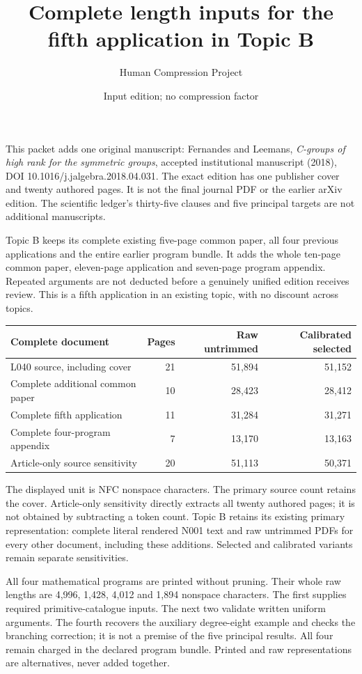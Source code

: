 \documentclass[11pt,a4paper]{article}
\title{Complete length inputs for the fifth application in Topic B}\author{Human Compression Project}\date{Input edition; no compression factor}
\begin{document}
\maketitle
This packet adds one original manuscript: Fernandes and Leemans, \emph{C-groups of high rank for the symmetric groups}, accepted institutional manuscript (2018), DOI 10.1016/j.jalgebra.2018.04.031. The exact edition has one publisher cover and twenty authored pages. It is not the final journal PDF or the earlier arXiv edition. The scientific ledger's thirty-five clauses and five principal targets are not additional manuscripts.

Topic B keeps its complete existing five-page common paper, all four previous applications and the entire earlier program bundle. It adds the whole ten-page common paper, eleven-page application and seven-page program appendix. Repeated arguments are not deducted before a genuinely unified edition receives review. This is a fifth application in an existing topic, with no discount across topics.

\begin{center}\small\begin{tabular}{lrrr}\toprule
Complete document & Pages & Raw untrimmed & Calibrated selected\\\midrule
L040 source, including cover & 21 & 51,894 & 51,152\\
Complete additional common paper & 10 & 28,423 & 28,412\\
Complete fifth application & 11 & 31,284 & 31,271\\
Complete four-program appendix & 7 & 13,170 & 13,163\\
Article-only source sensitivity & 20 & 51,113 & 50,371\\
\bottomrule\end{tabular}\end{center}
The displayed unit is NFC nonspace characters. The primary source count retains the cover. Article-only sensitivity directly extracts all twenty authored pages; it is not obtained by subtracting a token count. Topic B retains its existing primary representation: complete literal rendered N001 text and raw untrimmed PDFs for every other document, including these additions. Selected and calibrated variants remain separate sensitivities.

All four mathematical programs are printed without pruning. Their whole raw lengths are 4,996, 1,428, 4,012 and 1,894 nonspace characters. The first supplies required primitive-catalogue inputs. The next two validate written uniform arguments. The fourth recovers the auxiliary degree-eight example and checks the branching correction; it is not a premise of the five principal results. All four remain charged in the declared program bundle. Printed and raw representations are alternatives, never added together.
\end{document}
